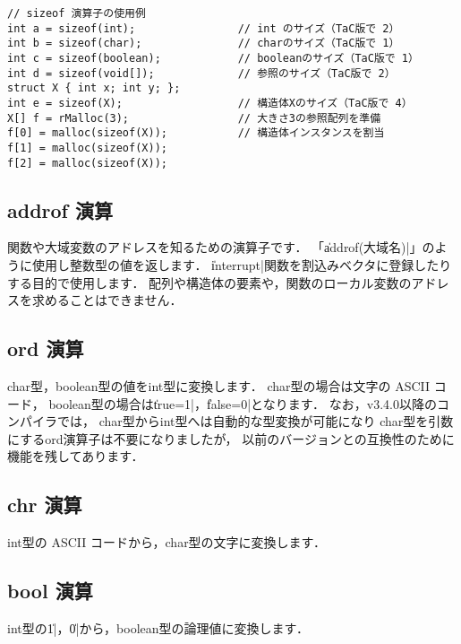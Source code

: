 \begin{mylist}
\begin{verbatim}
// sizeof 演算子の使用例
int a = sizeof(int);                // int のサイズ（TaC版で 2）
int b = sizeof(char);               // charのサイズ（TaC版で 1）
int c = sizeof(boolean);            // booleanのサイズ（TaC版で 1）
int d = sizeof(void[]);             // 参照のサイズ（TaC版で 2）
struct X { int x; int y; };
int e = sizeof(X);                  // 構造体Xのサイズ（TaC版で 4）
X[] f = rMalloc(3);                 // 大きさ3の参照配列を準備
f[0] = malloc(sizeof(X));           // 構造体インスタンスを割当
f[1] = malloc(sizeof(X));
f[2] = malloc(sizeof(X));
\end{verbatim}
\end{mylist}

\subsection{addrof 演算}
\label{chap3:addrof}

関数や大域変数のアドレスを知るための演算子です．
「\|addrof(大域名)|」のように使用し整数型の値を返します．
\|interrupt|関数を割込みベクタに登録したりする目的で使用します．
配列や構造体の要素や，関数のローカル変数のアドレスを求めることはできません．

\subsection{ord 演算}
\label{chap3:ord}

char型，boolean型の値をint型に変換します．
char型の場合は文字の ASCII コード，
boolean型の場合は\|true=1|，\|false=0|となります．
なお，v3.4.0以降のコンパイラでは，
char型からint型へは自動的な型変換が可能になり
char型を引数にするord演算子は不要になりましたが，
以前のバージョンとの互換性のために機能を残してあります．

\subsection{chr 演算}
\label{chap3:chr}

int型の ASCII コードから，char型の文字に変換します．

\subsection{bool 演算}
\label{chap3:bool}

int型の\|1|，\|0|から，boolean型の論理値に変換します．

